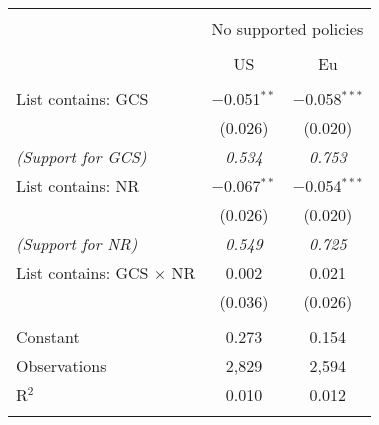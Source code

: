 
\begin{tabular}{@{\extracolsep{5pt}}lcc} 
\\[-1.8ex]\hline 
\hline \\[-1.8ex] 
 & \multicolumn{2}{c}{No supported policies} \\ 
\cline{2-3} 
\\[-1.8ex] & US & Eu \\ 
\hline \\[-1.8ex] 
 List contains: GCS & $-$0.051$^{**}$ & $-$0.058$^{***}$ \\ 
  & (0.026) & (0.020) \\ 
\textit{(Support for GCS)} & \textit{ 0.534 } & \textit{ 0.753 }\\
  List contains: NR & $-$0.067$^{**}$ & $-$0.054$^{***}$ \\ 
  & (0.026) & (0.020) \\ 
\textit{(Support for NR)} & \textit{ 0.549 } & \textit{ 0.725 }\\
  List contains: GCS $\times$ NR & 0.002 & 0.021 \\ 
  & (0.036) & (0.026) \\ 
 \hline \\[-1.8ex] 
Constant & 0.273 & 0.154 \\ 
Observations & 2,829 & 2,594 \\ 
R$^{2}$ & 0.010 & 0.012 \\ 
\hline 
\hline \\[-1.8ex] 
\end{tabular} 